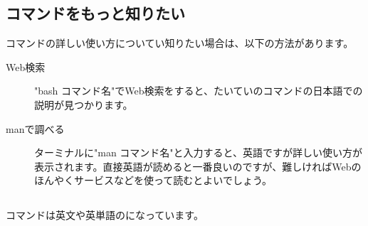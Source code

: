 \subsection{コマンドをもっと知りたい}
コマンドの詳しい使い方についてい知りたい場合は、以下の方法があります。
\begin{description}
    \item[Web検索] "bash コマンド名"でWeb検索をすると、たいていのコマンドの日本語での説明が見つかります。
    \item[manで調べる] ターミナルに"man コマンド名"と入力すると、英語ですが詳しい使い方が表示されます。直接英語が読めると一番良いのですが、難しければWebのほんやくサービスなどを使って読むとよいでしょう。
\end{description}

\subsection{}
\label{英語と日本語の対応表}
コマンドは英文や英単語のになっています。\\
